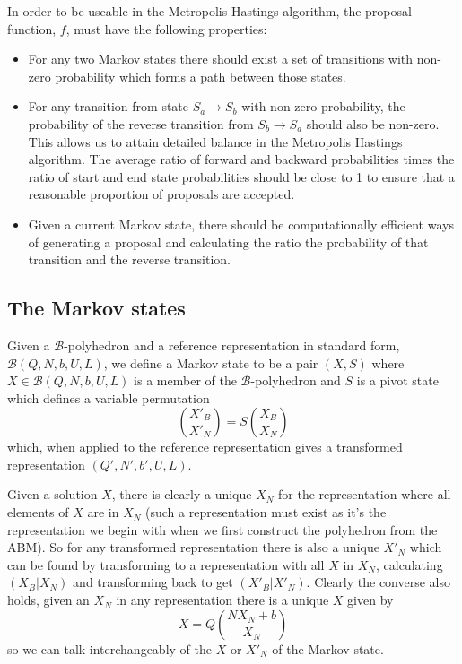 \documentclass{article}
\begin{document}
In order to be useable in the Metropolis-Hastings algorithm, the proposal function, $f$, must have the following properties:
\begin{itemize}
	\item For any two Markov states there should exist a set of transitions with non-zero probability which forms a path between those states.
	
	\item For any transition from state $S_a \to S_b$ with non-zero probability, the probability of the reverse transition from $S_b \to S_a$ should also be non-zero. This allows us to attain detailed balance in the Metropolis Hastings algorithm. The average ratio of forward and backward probabilities times the ratio of start and end state probabilities should be close to 1 to ensure that a reasonable proportion of proposals are accepted.
	
	\item Given a current Markov state, there should be computationally efficient ways of generating a proposal and calculating the ratio the probability of that transition and the reverse transition. 
\end{itemize}


\subsection{The Markov states}

Given a $\mathcal{B}$-polyhedron and a reference representation in standard form, $\mathcal{B}(Q,N,b,U,L)$, we define a Markov state to be a pair $(X,S)$ where $X \in \mathcal{B}(Q,N,b,U,L)$ is a member of the $\mathcal{B}$-polyhedron and $S$ is a pivot state which defines a variable permutation
\[
{X'_B \choose X'_N} = S{X_B \choose X_N}
\]
which, when applied to the reference representation gives a transformed representation $(Q',N',b',U,L)$.

Given a solution $X$, there is clearly a unique $X_N$ for the representation where all elements of $X$ are in $X_N$ (such a representation must exist as it's the representation we begin with when we first construct the polyhedron from the ABM). So for any transformed representation there is also a unique $X'_N$ which can be found by transforming to a representation with all $X$ in $X_N$, calculating $(X_B|X_N)$ and transforming back to get $(X'_B|X'_N)$. Clearly the converse also holds, given an $X_N$ in any representation there is a unique $X$ given by
\[
X = Q{N X_N + b \choose X_N}
\]
so we can talk interchangeably of the $X$ or $X'_N$ of the Markov state.
\end{document}
